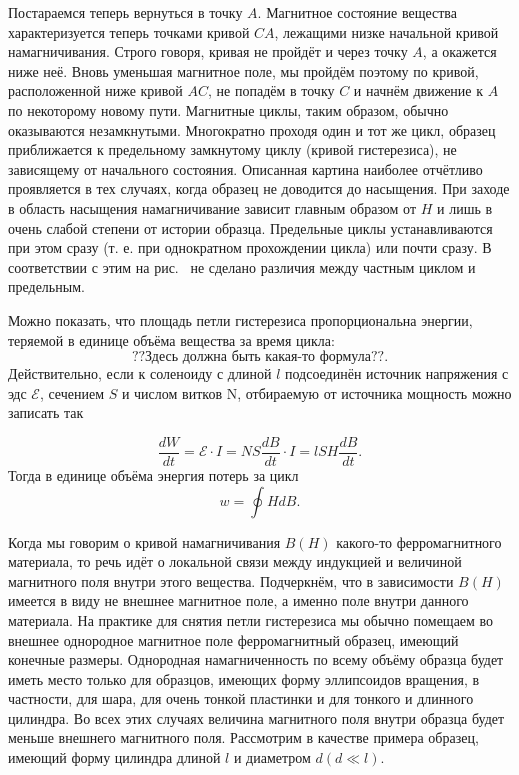 Постараемся теперь вернуться в точку $A$. Магнитное состояние вещества характеризуется теперь точками кривой $CA$, лежащими низке начальной кривой намагничивания. Строго говоря, кривая не пройдёт и через точку $A$, а окажется ниже неё. Вновь уменьшая магнитное поле, мы пройдём поэтому по кривой, расположенной ниже кривой $AC$, не попадём в точку $C$ и начнём движение к $A$ по некоторому новому пути. Магнитные циклы, таким образом, обычно оказываются незамкнутыми. Многократно проходя один и тот же цикл, образец приближается к предельному замкнутому циклу (кривой гистерезиса), не зависящему от начального состояния. Описанная картина наиболее отчётливо проявляется в тех случаях, когда образец не доводится до насыщения. При заходе в область насыщения намагничивание зависит главным образом от $H$ и лишь в очень слабой степени от истории образца. Предельные циклы устанавливаются при этом сразу (т. е. при однократном прохождении цикла) или почти сразу. В соответствии с этим на рис.~ не сделано различия между частным циклом и предельным.

Можно показать, что площадь петли гистерезиса пропорциональна энергии, теряемой в единице объёма вещества за время цикла:
\begin{equation*}
	\text{??Здесь должна быть какая-то формула??}.
\end{equation*}
Действительно, если к соленоиду с длиной $l$ подсоединён источник напряжения с эдс $\mathscr{E}$, сечением $S$ и числом витков N, отбираемую от источника мощность можно записать так

\begin{equation*}
	\frac{dW}{dt} = \mathscr{E} \cdot I = NS \frac{dB}{dt} \cdot I = lSH \frac{dB}{dt}.
\end{equation*}
Тогда в единице объёма энергия потерь за цикл
\begin{equation*}
	w = \oint {HdB}.
\end{equation*}


Когда мы говорим о кривой намагничивания $B(H)$ какого-то ферромагнитного материала, то речь идёт о локальной связи между индукцией и величиной магнитного поля внутри этого вещества. Подчеркнём, что в зависимости $B(H)$ имеется в виду не внешнее магнитное поле, а именно поле внутри данного материала. На практике для снятия петли гистерезиса мы обычно помещаем во внешнее однородное магнитное поле ферромагнитный образец, имеющий конечные размеры. Однородная намагниченность по всему объёму образца будет иметь место только для образцов, имеющих форму эллипсоидов вращения, в частности, для шара, для очень тонкой пластинки и для тонкого и длинного цилиндра. Во всех этих случаях величина магнитного поля внутри образца будет меньше внешнего магнитного поля. Рассмотрим в качестве примера образец, имеющий форму цилиндра длиной $l$ и диаметром $d (d \ll l)$.

